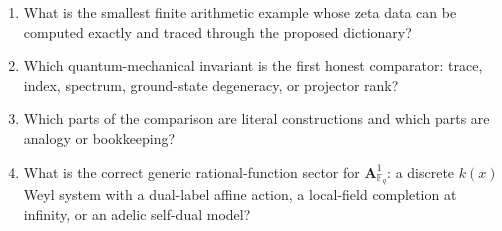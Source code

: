 \begin{enumerate}
  \item What is the smallest finite arithmetic example whose zeta data can be
  computed exactly and traced through the proposed dictionary?
  \item Which quantum-mechanical invariant is the first honest comparator:
  trace, index, spectrum, ground-state degeneracy, or projector rank?
  \item Which parts of the comparison are literal constructions and which parts
  are analogy or bookkeeping?
  \item What is the correct generic rational-function sector for
  \(\mathbf A^1_{\mathbb F_q}\): a discrete \(k(x)\) Weyl system with a
  dual-label affine action, a local-field completion at infinity, or an adelic
  self-dual model?
\end{enumerate}
